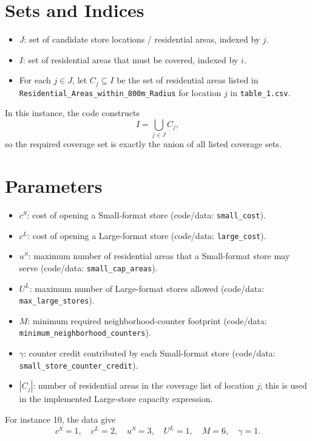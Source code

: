 \section*{Sets and Indices}

\begin{itemize}
  \item $J$: set of candidate store locations / residential areas, indexed by $j$.
  \item $I$: set of residential areas that must be covered, indexed by $i$.
  \item For each $j \in J$, let $C_j \subseteq I$ be the set of residential areas listed in \texttt{Residential\_Areas\_within\_800m\_Radius} for location $j$ in \texttt{table\_1.csv}.
\end{itemize}

In this instance, the code constructs
\[
I = \bigcup_{j \in J} C_j,
\]
so the required coverage set is exactly the union of all listed coverage sets.

\section*{Parameters}

\begin{itemize}
  \item $c^{S}$: cost of opening a Small-format store (code/data: \texttt{small\_cost}).
  \item $c^{L}$: cost of opening a Large-format store (code/data: \texttt{large\_cost}).
  \item $u^{S}$: maximum number of residential areas that a Small-format store may serve (code/data: \texttt{small\_cap\_areas}).
  \item $U^{L}$: maximum number of Large-format stores allowed (code/data: \texttt{max\_large\_stores}).
  \item $M$: minimum required neighborhood-counter footprint (code/data: \texttt{minimum\_neighborhood\_counters}).
  \item $\gamma$: counter credit contributed by each Small-format store (code/data: \texttt{small\_store\_counter\_credit}).
  \item $|C_j|$: number of residential areas in the coverage list of location $j$; this is used in the implemented Large-store capacity expression.
\end{itemize}

For instance 10, the data give
\[
c^{S}=1,\quad c^{L}=2,\quad u^{S}=3,\quad U^{L}=1,\quad M=6,\quad \gamma=1.
\]

